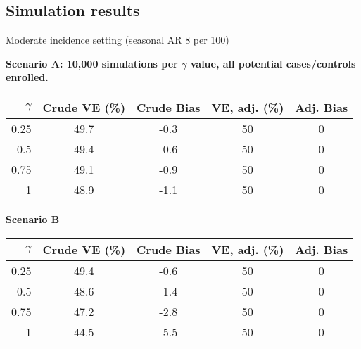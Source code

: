 \documentclass{beamer}
\begin{document}
 \subsection{Simulation results}
 \begin{frame}{Moderate incidence setting (seasonal AR 8 per 100)}
 
 {\footnotesize
 	\textbf{Scenario A: 10,000 simulations per $\gamma$ value, all potential cases/controls enrolled.}
 \begin{table}
 	\begin{tabular}{rcccc}
 		$\gamma$ & Crude VE (\%) & Crude Bias & VE, adj.  (\%)& Adj. Bias \\
 		\hline
 	0.25 & 49.7 & -0.3 & 50 & 0 \\ 
 	0.5 & 49.4 & -0.6 & 50 & 0 \\ 
 	0.75 & 49.1 & -0.9 & 50 & 0 \\ 
 	1 & 48.9 & -1.1 & 50 & 0 \\ 
 		\hline
 	\end{tabular}
 \end{table}
 
 
\textbf{Scenario B}
  \begin{table}
 	\begin{tabular}{rcccc}
 		$\gamma$ & Crude VE (\%) & Crude Bias & VE, adj.  (\%)& Adj. Bias \\
 		\hline
0.25 & 49.4 & -0.6 & 50 & 0 \\ 
0.5 & 48.6 & -1.4 & 50 & 0 \\ 
0.75 & 47.2 & -2.8 & 50 & 0 \\ 
1 & 44.5 & -5.5 & 50 & 0 \\
 		\hline
 	\end{tabular}
 \end{table}
}
\end{frame}
%
\end{document}
